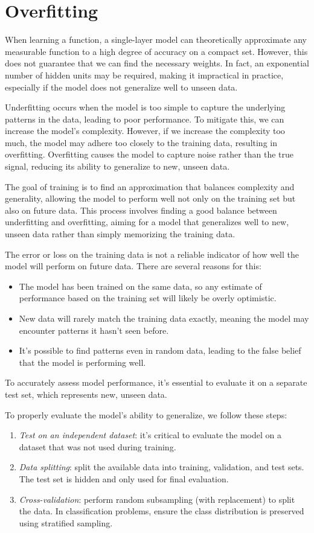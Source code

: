 \section{Overfitting}

When learning a function, a single-layer model can theoretically approximate any measurable function to a high degree of accuracy on a compact set. 
However, this does not guarantee that we can find the necessary weights.
In fact, an exponential number of hidden units may be required, making it impractical in practice, especially if the model does not generalize well to unseen data.

Underfitting occurs when the model is too simple to capture the underlying patterns in the data, leading to poor performance. 
To mitigate this, we can increase the model's complexity. 
However, if we increase the complexity too much, the model may adhere too closely to the training data, resulting in overfitting. 
Overfitting causes the model to capture noise rather than the true signal, reducing its ability to generalize to new, unseen data.

The goal of training is to find an approximation that balances complexity and generality, allowing the model to perform well not only on the training set but also on future data. 
This process involves finding a good balance between underfitting and overfitting, aiming for a model that generalizes well to new, unseen data rather than simply memorizing the training data.

The error or loss on the training data is not a reliable indicator of how well the model will perform on future data. There are several reasons for this:
\begin{itemize}
    \item The model has been trained on the same data, so any estimate of performance based on the training set will likely be overly optimistic.
    \item New data will rarely match the training data exactly, meaning the model may encounter patterns it hasn't seen before.
    \item It's possible to find patterns even in random data, leading to the false belief that the model is performing well.
\end{itemize}
To accurately assess model performance, it's essential to evaluate it on a separate test set, which represents new, unseen data.

To properly evaluate the model's ability to generalize, we follow these steps:
\begin{enumerate}
    \item \textit{Test on an independent dataset}: it's critical to evaluate the model on a dataset that was not used during training.
    \item \textit{Data splitting}: split the available data into training, validation, and test sets. 
        The test set is hidden and only used for final evaluation.
    \item \textit{Cross-validation}: perform random subsampling (with replacement) to split the data. 
        In classification problems, ensure the class distribution is preserved using stratified sampling.
\end{enumerate}

